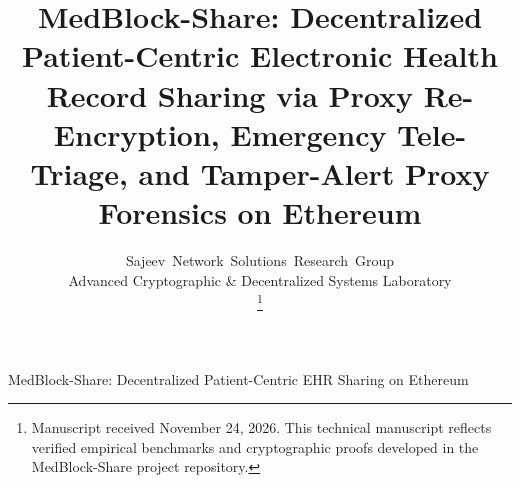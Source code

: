 \documentclass[journal,10pt,twocolumn]{IEEEtran}
\begin{document}
\title{MedBlock-Share: Decentralized Patient-Centric Electronic Health Record Sharing via Proxy Re-Encryption, Emergency Tele-Triage, and Tamper-Alert Proxy Forensics on Ethereum}

\author{Sajeev~Network~Solutions~Research~Group\\
Advanced Cryptographic \& Decentralized Systems Laboratory\\
\thanks{Manuscript received November 24, 2026. This technical manuscript reflects verified empirical benchmarks and cryptographic proofs developed in the MedBlock-Share project repository.}}

%
{MedBlock-Share: Decentralized Patient-Centric EHR Sharing on Ethereum}

\maketitle
\end{document}
